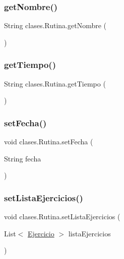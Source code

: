 \subsubsection{\texorpdfstring{get\+Nombre()}{getNombre()}}
{\footnotesize\ttfamily String clases.\+Rutina.\+get\+Nombre (\begin{DoxyParamCaption}{ }\end{DoxyParamCaption})}

\mbox{\label{classclases_1_1_rutina_a07c7e78b496f8a36252e77443f211274}} 
\subsubsection{\texorpdfstring{get\+Tiempo()}{getTiempo()}}
{\footnotesize\ttfamily String clases.\+Rutina.\+get\+Tiempo (\begin{DoxyParamCaption}{ }\end{DoxyParamCaption})}

\mbox{\label{classclases_1_1_rutina_a9d5d8b01368164bfdb313a773e804301}} 
\subsubsection{\texorpdfstring{set\+Fecha()}{setFecha()}}
{\footnotesize\ttfamily void clases.\+Rutina.\+set\+Fecha (\begin{DoxyParamCaption}\item[{String}]{fecha }\end{DoxyParamCaption})}

\mbox{\label{classclases_1_1_rutina_a99004eb2c97b186320ad1ff84008dd04}} 
\subsubsection{\texorpdfstring{set\+Lista\+Ejercicios()}{setListaEjercicios()}}
{\footnotesize\ttfamily void clases.\+Rutina.\+set\+Lista\+Ejercicios (\begin{DoxyParamCaption}\item[{List$<$ \mbox{\hyperlink{classclases_1_1_ejercicio}{Ejercicio}} $>$}]{lista\+Ejercicios }\end{DoxyParamCaption})}

